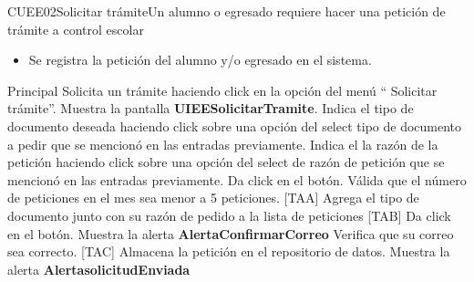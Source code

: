 \begin{UseCase}{CUEE02}{Solicitar trámite}{Un alumno o egresado requiere hacer una petición de trámite a control escolar}
{\begin{itemize}
      \item Se registra la petición del alumno y/o egresado en el sistema.
    \end{itemize}
  }
\end{UseCase}

\begin{UCtrayectoria}{Principal}
  \UCpaso[\UCactor] Solicita un trámite haciendo click en la opción del menú `` Solicitar trámite”.
  \UCpaso Muestra la pantalla  {\bf UIEESolicitarTramite}.
  \UCpaso[\UCactor] Indica el tipo de documento deseada haciendo click sobre una opción del select tipo de documento a pedir  que se mencionó en las entradas previamente.
  \UCpaso[\UCactor] Indica el la razón de la petición haciendo click sobre una opción del select de razón de petición que se mencionó en las entradas previamente.
  \UCpaso[\UCactor] Da click en el botón.
  \UCpaso  Válida que el número de peticiones en el mes sea menor a 5 peticiones. [TAA] 
  \UCpaso Agrega el tipo de documento junto con su razón de pedido a la lista de peticiones [TAB]
  \UCpaso[\UCactor]  Da click en el botón.
  \UCpaso Muestra la alerta {\bf AlertaConfirmarCorreo} 
  \UCpaso[\UCactor] Verifica que su correo sea correcto. [TAC]
  \UCpaso Almacena la petición en el repositorio de datos.
  \UCpaso Muestra la alerta  {\bf AlertasolicitudEnviada}
\end{UCtrayectoria}

